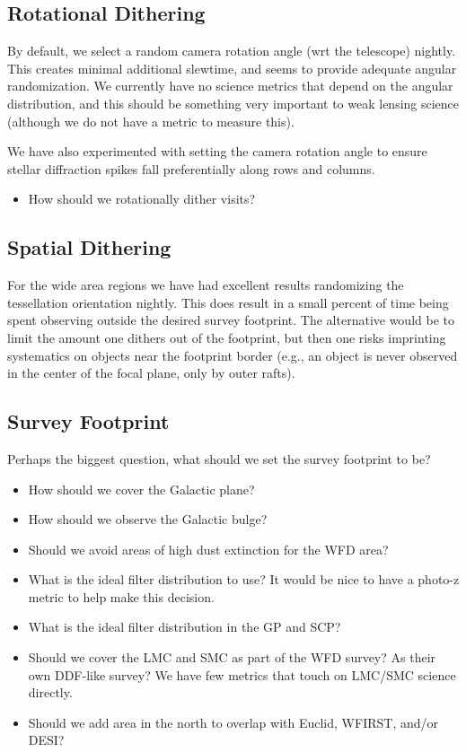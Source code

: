 \subsection{Rotational Dithering}

By default, we select a random camera rotation angle (wrt the telescope) nightly. This creates minimal additional slewtime, and seems to provide adequate angular randomization.  We currently have no science metrics that depend on the angular distribution, and this should be something very important to weak lensing science (although we do not have a metric to measure this).

We have also experimented with setting the camera rotation angle to ensure stellar diffraction spikes fall preferentially along rows and columns. 

\begin{itemize}
    \item{How should we rotationally dither visits?}
\end{itemize}

\subsection{Spatial Dithering}

For the wide area regions we have had excellent results randomizing the tessellation orientation nightly. This does result in a small percent of time being spent observing outside the desired survey footprint. The alternative would be to limit the amount one dithers out of the footprint, but then one risks imprinting systematics on objects near the footprint border (e.g., an object is never observed in the center of the focal plane, only by outer rafts).


\subsection{Survey Footprint}

Perhaps the biggest question, what should we set the survey footprint to be?

\begin{itemize}
    \item{How should we cover the Galactic plane?}
    \item{How should we observe the Galactic bulge?}
    \item{Should we avoid areas of high dust extinction for the WFD area?}
    \item{What is the ideal filter distribution to use? It would be nice to have a photo-z metric to help make this decision.}
    \item{What is the ideal filter distribution in the GP and SCP?}
    \item{Should we cover the LMC and SMC as part of the WFD survey? As their own DDF-like survey? We have few metrics that touch on LMC/SMC science directly.}
    \item{Should we add area in the north to overlap with Euclid, WFIRST, and/or DESI?}
\end{itemize}

